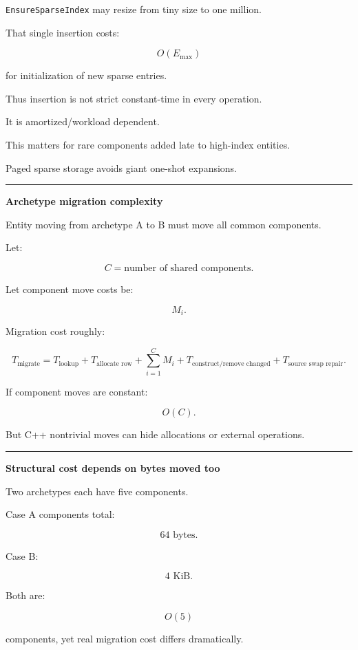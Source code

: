 \texttt{EnsureSparseIndex} may resize from tiny size to one million.

That single insertion costs:

\[
O(E_{\max})
\]

for initialization of new sparse entries.

Thus insertion is not strict constant-time in every operation.

It is amortized/workload dependent.

This matters for rare components added late to high-index entities.

Paged sparse storage avoids giant one-shot expansions.

\begin{center}\rule{0.5\linewidth}{0.5pt}\end{center}

\textbf{Archetype migration complexity}

Entity moving from archetype A to B must move all common components.

Let:

\[
C=
\text{number of shared components}.
\]

Let component move costs be:

\[
M_i.
\]

Migration cost roughly:

\[
\boxed{
T_{\text{migrate}}
=
T_{\text{lookup}}
+
T_{\text{allocate row}}
+
\sum_{i=1}^{C}M_i
+
T_{\text{construct/remove changed}}
+
T_{\text{source swap repair}}.
}
\]

If component moves are constant:

\[
O(C).
\]

But C++ nontrivial moves can hide allocations or external operations.

\begin{center}\rule{0.5\linewidth}{0.5pt}\end{center}

\textbf{Structural cost depends on bytes moved too}

Two archetypes each have five components.

Case A components total:

\[
64\text{ bytes}.
\]

Case B:

\[
4\text{ KiB}.
\]

Both are:

\[
O(5)
\]

components, yet real migration cost differs dramatically.

